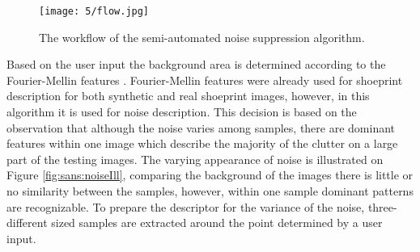 \documentclass[draft,final]{vutinfth} %
\begin{document}
\begin{figure}[h]
  \centering
  \texttt{[image: 5/flow.jpg]}
  \caption{The workflow of the semi-automated noise suppression algorithm.}
  \label{fig:sans:workflow} %
\end{figure}

\par
Based on the user input the background area is determined according to the Fourier-Mellin features \cite{sheng1986circular}.
Fourier-Mellin features were already used for shoeprint description for both synthetic \cite{gueham2008automatic} and real \cite{wu2019crime} shoeprint images, however, in this algorithm it is used for noise description.
This decision is based on the observation that although the noise varies among samples, there are dominant features within one image which describe the majority of the clutter on a large part of the testing images.
The varying appearance of noise is illustrated on Figure \ref{fig:sans:noiseIll}, comparing the background of the images there is little or no similarity between the samples, however, within one sample dominant patterns are recognizable.
To prepare the descriptor for the variance of the noise, three-different sized samples are extracted around the point determined by a user input.
\end{document}
